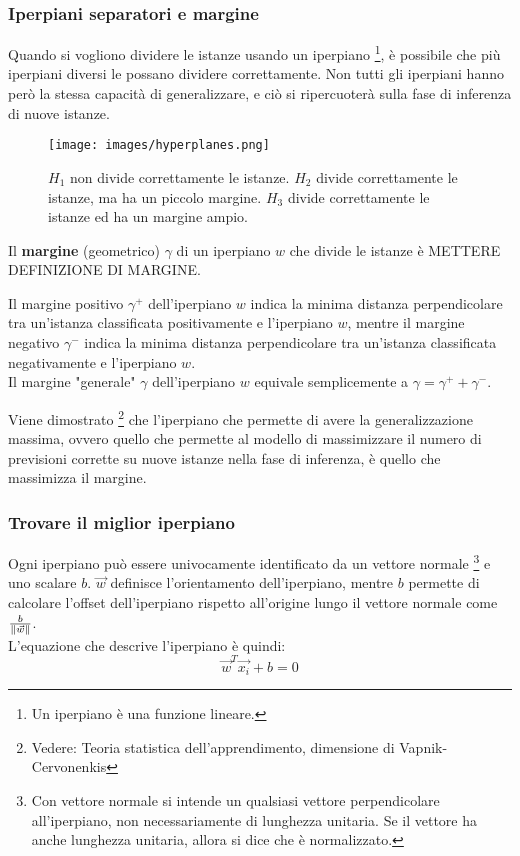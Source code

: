 \subsubsection{Iperpiani separatori e margine}
Quando si vogliono dividere le istanze usando un iperpiano \footnote{Un iperpiano è una funzione lineare.}, è possibile che più iperpiani diversi le possano dividere correttamente.
Non tutti gli iperpiani hanno però la stessa capacità di generalizzare, e ciò si ripercuoterà sulla fase di inferenza di nuove istanze.
\begin{figure}[h]
    \centering
    \texttt{[image: images/hyperplanes.png]}
    \caption{$H_1$ non divide correttamente le istanze. $H_2$ divide correttamente le istanze, ma ha un piccolo margine. $H_3$ divide correttamente le istanze ed ha un margine ampio.}
    \label{fig:svm_margin}
\end{figure}
\begin{defn}
    Il \textbf{margine} (geometrico) $\gamma$ di un iperpiano $w$ che divide le istanze è METTERE DEFINIZIONE DI MARGINE. 

    Il margine positivo $\gamma^+$ dell'iperpiano $w$ indica la minima distanza perpendicolare tra un'istanza classificata positivamente e l'iperpiano $w$, mentre il margine negativo $\gamma^-$ indica la minima distanza perpendicolare tra un'istanza classificata negativamente e l'iperpiano $w$.\\
    Il margine "generale" $\gamma$ dell'iperpiano $w$ equivale semplicemente a $\gamma = \gamma^+ + \gamma^-$.
\end{defn}
Viene dimostrato \footnote{Vedere: Teoria statistica dell'apprendimento, dimensione di Vapnik-Cervonenkis} che l'iperpiano che permette di avere la generalizzazione massima, ovvero quello che permette al modello di massimizzare il numero di previsioni corrette su nuove istanze nella fase di inferenza, è quello che massimizza il margine.

\subsubsection{Trovare il miglior iperpiano}
Ogni iperpiano può essere univocamente identificato da un vettore normale \footnote{Con vettore normale si intende un qualsiasi vettore perpendicolare all'iperpiano, non necessariamente di lunghezza unitaria. Se il vettore ha anche lunghezza unitaria, allora si dice che è normalizzato.} e uno scalare $b$.
$\Vec{w}$ definisce l'orientamento dell'iperpiano, mentre $b$ permette di calcolare l'offset dell'iperpiano rispetto all'origine lungo il vettore normale come $\frac{b}{\left\lVert\Vec{w}\right\rVert}$.\\
L'equazione che descrive l'iperpiano è quindi:
\begin{equation*}
    \Vec{w}^T \Vec{x_i} + b = 0
\end{equation*}

